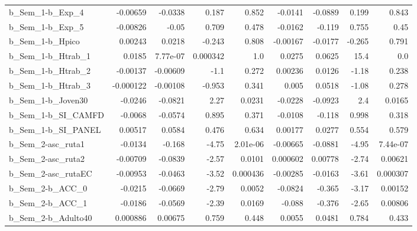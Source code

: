 \begin{tabular}{lrrrrrrrr}
b\_Sem\_1-b\_Exp\_4            &    -0.00659 &      -0.0338 &     0.187 &    0.852 &    -0.0141 &     -0.0889 &        0.199 &         0.843 \\
b\_Sem\_1-b\_Exp\_5            &    -0.00826 &        -0.05 &     0.709 &    0.478 &    -0.0162 &      -0.119 &        0.755 &          0.45 \\
b\_Sem\_1-b\_Hpico            &     0.00243 &       0.0218 &    -0.243 &    0.808 &   -0.00167 &     -0.0177 &       -0.265 &         0.791 \\
b\_Sem\_1-b\_Htrab\_1          &      0.0185 &     7.77e-07 &  0.000342 &      1.0 &     0.0275 &      0.0625 &         15.4 &           0.0 \\
b\_Sem\_1-b\_Htrab\_2          &    -0.00137 &     -0.00609 &      -1.1 &    0.272 &    0.00236 &      0.0126 &        -1.18 &         0.238 \\
b\_Sem\_1-b\_Htrab\_3          &   -0.000122 &     -0.00108 &    -0.953 &    0.341 &      0.005 &      0.0518 &        -1.08 &         0.278 \\
b\_Sem\_1-b\_Joven30          &     -0.0246 &      -0.0821 &      2.27 &   0.0231 &    -0.0228 &     -0.0923 &          2.4 &        0.0165 \\
b\_Sem\_1-b\_SI\_CAMFD         &     -0.0068 &      -0.0574 &     0.895 &    0.371 &    -0.0108 &      -0.118 &        0.998 &         0.318 \\
b\_Sem\_1-b\_SI\_PANEL         &     0.00517 &       0.0584 &     0.476 &    0.634 &    0.00177 &      0.0277 &        0.554 &         0.579 \\
b\_Sem\_2-asc\_ruta1          &     -0.0134 &       -0.168 &     -4.75 & 2.01e-06 &   -0.00665 &     -0.0881 &        -4.95 &      7.44e-07 \\
b\_Sem\_2-asc\_ruta2          &    -0.00709 &      -0.0839 &     -2.57 &   0.0101 &   0.000602 &     0.00778 &        -2.74 &       0.00621 \\
b\_Sem\_2-asc\_rutaEC         &    -0.00953 &      -0.0463 &     -3.52 & 0.000436 &   -0.00285 &     -0.0163 &        -3.61 &      0.000307 \\
b\_Sem\_2-b\_ACC\_0            &     -0.0215 &      -0.0669 &     -2.79 &   0.0052 &    -0.0824 &      -0.365 &        -3.17 &       0.00152 \\
b\_Sem\_2-b\_ACC\_1            &     -0.0186 &      -0.0569 &     -2.39 &   0.0169 &     -0.088 &      -0.376 &        -2.65 &       0.00806 \\
b\_Sem\_2-b\_Adulto40         &    0.000886 &      0.00675 &     0.759 &    0.448 &     0.0055 &      0.0481 &        0.784 &         0.433 \\

\end{tabular}
